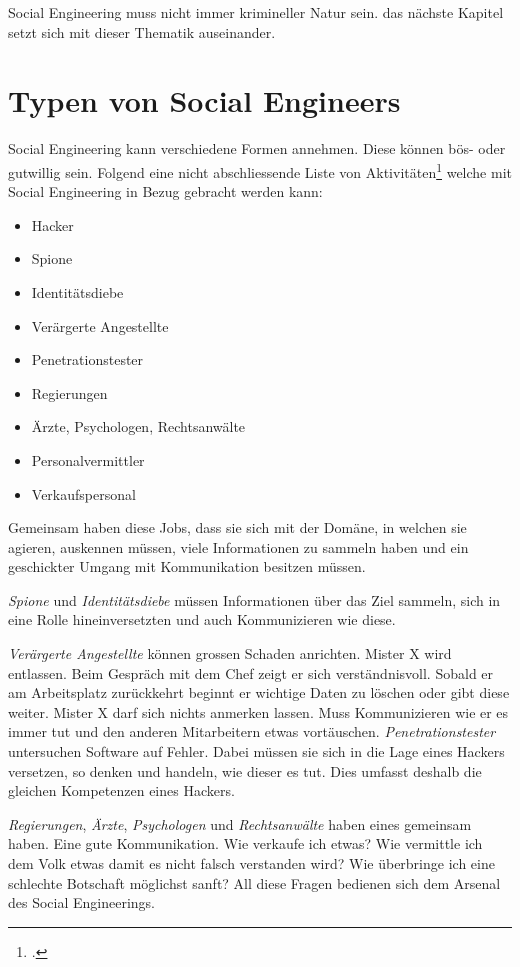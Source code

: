 Social Engineering muss nicht immer krimineller Natur sein. das nächste Kapitel setzt sich mit dieser Thematik auseinander.

\section{Typen von Social Engineers}
Social Engineering kann verschiedene Formen annehmen. Diese können bös- oder gutwillig sein. Folgend eine nicht abschliessende Liste von Aktivitäten\footcite{human_hacking} welche mit Social Engineering in Bezug gebracht werden kann:

\begin{itemize}
\item Hacker
\item Spione
\item Identitätsdiebe
\item Verärgerte Angestellte
\item Penetrationstester
\item Regierungen
\item Ärzte, Psychologen, Rechtsanwälte
\item Personalvermittler
\item Verkaufspersonal 
\end{itemize}

Gemeinsam haben diese Jobs, dass sie sich mit der Domäne, in welchen sie agieren, auskennen müssen, viele Informationen zu sammeln haben und ein geschickter Umgang mit Kommunikation besitzen müssen.

\textit{Spione} und \textit{Identitätsdiebe} müssen Informationen über das Ziel sammeln, sich in eine Rolle hineinversetzten und auch Kommunizieren wie diese.

\textit{Verärgerte Angestellte} können grossen Schaden anrichten. Mister X wird entlassen. Beim Gespräch mit dem Chef zeigt er sich verständnisvoll. Sobald er am Arbeitsplatz zurückkehrt beginnt er wichtige Daten zu löschen oder gibt diese weiter. Mister X darf sich nichts anmerken lassen. Muss Kommunizieren wie er es immer tut und den anderen Mitarbeitern etwas vortäuschen.
\textit{Penetrationstester} untersuchen Software auf Fehler. Dabei müssen sie sich in die Lage eines Hackers versetzen, so denken und handeln, wie dieser es tut. Dies umfasst deshalb die gleichen Kompetenzen eines Hackers.

\textit{Regierungen}, \textit{Ärzte}, \textit{Psychologen} und \textit{Rechtsanwälte} haben eines gemeinsam haben. Eine gute Kommunikation. Wie verkaufe ich etwas? Wie vermittle ich dem Volk etwas damit es nicht falsch verstanden wird? Wie überbringe ich eine schlechte Botschaft möglichst sanft? All diese Fragen bedienen sich dem Arsenal des Social Engineerings.

